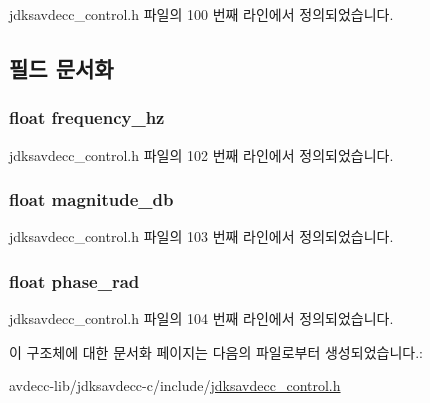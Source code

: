 jdksavdecc\+\_\+control.\+h 파일의 100 번째 라인에서 정의되었습니다.



\subsection{필드 문서화}
\subsubsection[{\texorpdfstring{frequency\+\_\+hz}{frequency_hz}}]{\setlength{\rightskip}{0pt plus 5cm}float frequency\+\_\+hz}\hypertarget{structjdksavdecc__control__bode__plot__point_a86b78ddbbd5e07fa57a0257c75c0c7e5}{}\label{structjdksavdecc__control__bode__plot__point_a86b78ddbbd5e07fa57a0257c75c0c7e5}


jdksavdecc\+\_\+control.\+h 파일의 102 번째 라인에서 정의되었습니다.

\subsubsection[{\texorpdfstring{magnitude\+\_\+db}{magnitude_db}}]{\setlength{\rightskip}{0pt plus 5cm}float magnitude\+\_\+db}\hypertarget{structjdksavdecc__control__bode__plot__point_a7a53dd9821ee2fdf9fd6387c75368525}{}\label{structjdksavdecc__control__bode__plot__point_a7a53dd9821ee2fdf9fd6387c75368525}


jdksavdecc\+\_\+control.\+h 파일의 103 번째 라인에서 정의되었습니다.

\subsubsection[{\texorpdfstring{phase\+\_\+rad}{phase_rad}}]{\setlength{\rightskip}{0pt plus 5cm}float phase\+\_\+rad}\hypertarget{structjdksavdecc__control__bode__plot__point_a4080b971d468d463b942c2279f7465a3}{}\label{structjdksavdecc__control__bode__plot__point_a4080b971d468d463b942c2279f7465a3}


jdksavdecc\+\_\+control.\+h 파일의 104 번째 라인에서 정의되었습니다.



이 구조체에 대한 문서화 페이지는 다음의 파일로부터 생성되었습니다.\+:\begin{DoxyCompactItemize}
\item 
avdecc-\/lib/jdksavdecc-\/c/include/\hyperlink{jdksavdecc__control_8h}{jdksavdecc\+\_\+control.\+h}\end{DoxyCompactItemize}

